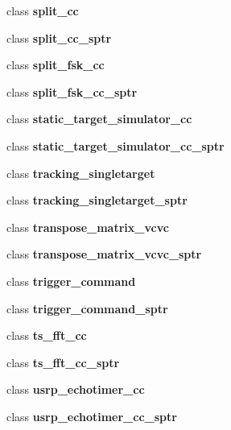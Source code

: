 \begin{DoxyCompactItemize}
\item 
class {\bf split\+\_\+cc}
\item 
class {\bf split\+\_\+cc\+\_\+sptr}
\item 
class {\bf split\+\_\+fsk\+\_\+cc}
\item 
class {\bf split\+\_\+fsk\+\_\+cc\+\_\+sptr}
\item 
class {\bf static\+\_\+target\+\_\+simulator\+\_\+cc}
\item 
class {\bf static\+\_\+target\+\_\+simulator\+\_\+cc\+\_\+sptr}
\item 
class {\bf tracking\+\_\+singletarget}
\item 
class {\bf tracking\+\_\+singletarget\+\_\+sptr}
\item 
class {\bf transpose\+\_\+matrix\+\_\+vcvc}
\item 
class {\bf transpose\+\_\+matrix\+\_\+vcvc\+\_\+sptr}
\item 
class {\bf trigger\+\_\+command}
\item 
class {\bf trigger\+\_\+command\+\_\+sptr}
\item 
class {\bf ts\+\_\+fft\+\_\+cc}
\item 
class {\bf ts\+\_\+fft\+\_\+cc\+\_\+sptr}
\item 
class {\bf usrp\+\_\+echotimer\+\_\+cc}
\item 
class {\bf usrp\+\_\+echotimer\+\_\+cc\+\_\+sptr}
\end{DoxyCompactItemize}
